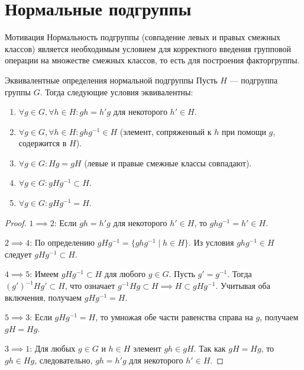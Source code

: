 
\section{Нормальные подгруппы}

\begin{Remark}{Мотивация}{}
	Нормальность подгруппы (совпадение левых и правых смежных классов) является необходимым условием для корректного введения групповой операции на множестве смежных классов, то есть для построения факторгруппы.
\end{Remark}

\begin{Proposition}{Эквивалентные определения нормальной подгруппы}{}
	Пусть $H$ --- подгруппа группы $G$. Тогда следующие условия эквивалентны:
	\begin{enumerate}
		\item $\forall g \in G, \forall h \in H \colon gh = h'g$ для некоторого $h' \in H$.
		\item $\forall g \in G, \forall h \in H \colon ghg^{-1} \in H$ (элемент, сопряженный к $h$ при помощи $g$, содержится в $H$).
		\item $\forall g \in G \colon Hg = gH$ (левые и правые смежные классы совпадают).
		\item $\forall g \in G \colon gHg^{-1} \subset H$.
		\item $\forall g \in G \colon gHg^{-1} = H$.
	\end{enumerate}
\end{Proposition}

\begin{proof}
	$1 \implies 2$:
	Если $gh = h'g$ для некоторого $h' \in H$, то $ghg^{-1} = h' \in H$.
	
	$2 \implies 4$:
	По определению $gHg^{-1} = \{ ghg^{-1} \mid h \in H \}$. Из условия $ghg^{-1} \in H$ следует $gHg^{-1} \subset H$.
	
	$4 \implies 5$:
	Имеем $gHg^{-1} \subset H$ для любого $g \in G$. Пусть $g' = g^{-1}$. Тогда $(g')^{-1}Hg' \subset H$, что означает $g^{-1}Hg \subset H \implies H \subset gHg^{-1}$. Учитывая оба включения, получаем $gHg^{-1} = H$.
	
	$5 \implies 3$:
	Если $gHg^{-1} = H$, то умножая обе части равенства справа на $g$, получаем $gH = Hg$.
	
	$3 \implies 1$:
	Для любых $g \in G$ и $h \in H$ элемент $gh \in gH$. Так как $gH = Hg$, то $gh \in Hg$, следовательно, $gh = h'g$ для некоторого $h' \in H$.
\end{proof}


